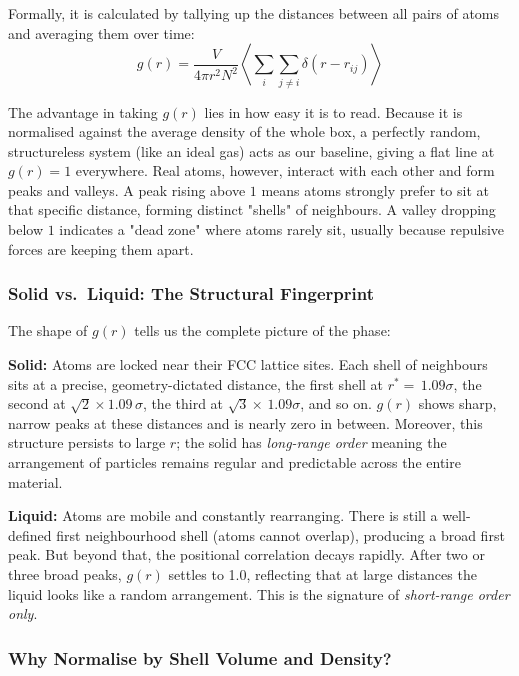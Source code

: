 Formally, it is calculated by tallying up the distances between all pairs of atoms and averaging them over time:
$$g(r) = \frac{V}{4\pi r^2 N^2} \left\langle \sum_i \sum_{j \neq i} \delta(r - r_{ij}) \right\rangle$$

The advantage in taking $g(r)$ lies in how easy it is to read. Because it is normalised against the average density of the whole box, a perfectly random, structureless system (like an ideal gas) acts as our baseline, giving a flat line at $g(r) = 1$ everywhere. Real atoms, however, interact with each other and form peaks and valleys. A peak rising above $1$ means atoms strongly prefer to sit at that specific distance, forming distinct "shells" of neighbours. A valley dropping below $1$ indicates a "dead zone" where atoms rarely sit, usually because repulsive forces are keeping them apart.

\subsubsection{Solid vs.\ Liquid: The Structural Fingerprint}

The shape of $g(r)$ tells us the complete picture of the phase:

\textbf{Solid:} Atoms are locked near their FCC lattice sites. Each shell of neighbours sits at a precise, geometry-dictated distance, the first shell at $r^* = \,1.09\sigma$, the second at $\sqrt{2}\times1.09\,\sigma$, the third at $\sqrt{3}\times\,1.09\sigma$, and so on. $g(r)$ shows sharp, narrow peaks at these distances and is nearly zero in between. Moreover, this structure persists to large $r$; the solid has \emph{long-range order} meaning the arrangement of particles remains regular and predictable across the entire material.

\textbf{Liquid:} Atoms are mobile and constantly rearranging. There is still a well-defined first neighbourhood shell (atoms cannot overlap), producing a broad first peak. But beyond that, the positional correlation decays rapidly. After two or three broad peaks, $g(r)$ settles to 1.0, reflecting that at large distances the liquid looks like a random arrangement. This is the signature of \emph{short-range order only}.

\subsubsection{Why Normalise by Shell Volume and Density?}

